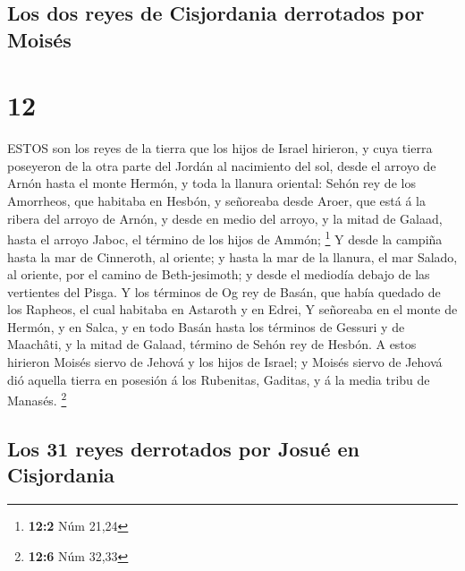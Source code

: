 \hypertarget{los-dos-reyes-de-cisjordania-derrotados-por-moisuxe9s}{%
\subsection{Los dos reyes de Cisjordania derrotados por
Moisés}\label{los-dos-reyes-de-cisjordania-derrotados-por-moisuxe9s}}

\hypertarget{section-11}{%
\section{12}\label{section-11}}

 ESTOS son los reyes de la tierra que los hijos de Israel
hirieron, y cuya tierra poseyeron de la otra parte del Jordán al
nacimiento del sol, desde el arroyo de Arnón hasta el monte Hermón, y
toda la llanura oriental:  Sehón rey de los Amorrheos, que
habitaba en Hesbón, y señoreaba desde Aroer, que está á la ribera del
arroyo de Arnón, y desde en medio del arroyo, y la mitad de Galaad,
hasta el arroyo Jaboc, el término de los hijos de Ammón; \footnote{\textbf{12:2}
  Núm 21,24}  Y desde la campiña hasta la mar de Cinneroth,
al oriente; y hasta la mar de la llanura, el mar Salado, al oriente, por
el camino de Beth-jesimoth; y desde el mediodía debajo de las vertientes
del Pisga.  Y los términos de Og rey de Basán, que había
quedado de los Rapheos, el cual habitaba en Astaroth y en Edrei,
 Y señoreaba en el monte de Hermón, y en Salca, y en todo
Basán hasta los términos de Gessuri y de Maachâti, y la mitad de Galaad,
término de Sehón rey de Hesbón.  A estos hirieron Moisés
siervo de Jehová y los hijos de Israel; y Moisés siervo de Jehová dió
aquella tierra en posesión á los Rubenitas, Gaditas, y á la media tribu
de Manasés. \footnote{\textbf{12:6} Núm 32,33}

\hypertarget{los-31-reyes-derrotados-por-josuuxe9-en-cisjordania}{%
\subsection{Los 31 reyes derrotados por Josué en
Cisjordania}\label{los-31-reyes-derrotados-por-josuuxe9-en-cisjordania}}

